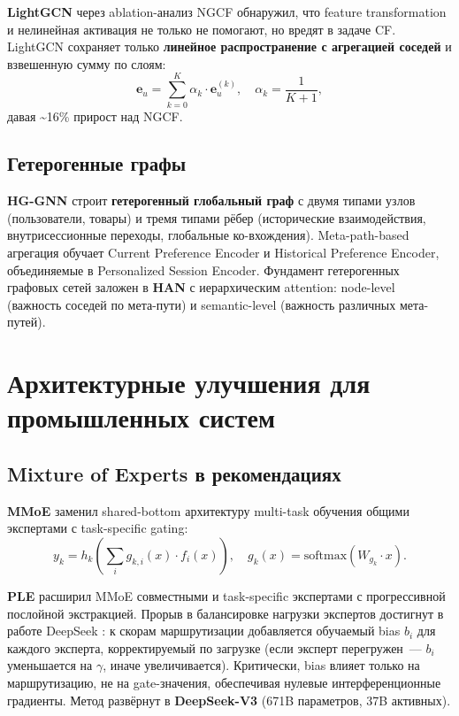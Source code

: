 \textbf{LightGCN} \cite{he2020lightgcn} через ablation-анализ NGCF обнаружил, что feature transformation и нелинейная активация не только не помогают, но вредят в задаче CF. LightGCN сохраняет только \textbf{линейное распространение с агрегацией соседей} и взвешенную сумму по слоям:
\begin{equation}
    \mathbf{e}_u = \sum_{k=0}^{K} \alpha_k \cdot \mathbf{e}_u^{(k)},\quad \alpha_k = \frac{1}{K+1},
\end{equation}
давая \textasciitilde16\% прирост над NGCF.

\subsection{Гетерогенные графы}
\label{subsec:ch1:heterogeneous}

\textbf{HG-GNN} \cite{pang2022hggnn} строит \textbf{гетерогенный глобальный граф} с двумя типами узлов (пользователи, товары) и тремя типами рёбер (исторические взаимодействия, внутрисессионные переходы, глобальные ко-вхождения). Meta-path-based агрегация обучает Current Preference Encoder и Historical Preference Encoder, объединяемые в Personalized Session Encoder. Фундамент гетерогенных графовых сетей заложен в \textbf{HAN} \cite{wang2019han} с иерархическим attention: node-level (важность соседей по мета-пути) и semantic-level (важность различных мета-путей).

\section{Архитектурные улучшения для промышленных систем}
\label{sec:ch1:industrial}

\subsection{Mixture of Experts в рекомендациях}
\label{subsec:ch1:moe}

\textbf{MMoE} \cite{ma2018mmoe} заменил shared-bottom архитектуру multi-task обучения общими экспертами с task-specific gating:
\begin{equation}
    y_k = h_k\!\left(\sum_i g_{k,i}(x) \cdot f_i(x)\right),\quad g_k(x) = \text{softmax}(W_{g_k} \cdot x).
\end{equation}

\textbf{PLE} \cite{tang2020ple} расширил MMoE совместными и task-specific экспертами с прогрессивной послойной экстракцией. Прорыв в балансировке нагрузки экспертов достигнут в работе DeepSeek \cite{wang2024deepseek}: к скорам маршрутизации добавляется обучаемый bias $b_i$ для каждого эксперта, корректируемый по загрузке (если эксперт перегружен~--- $b_i$ уменьшается на $\gamma$, иначе увеличивается). Критически, bias влияет только на маршрутизацию, не на gate-значения, обеспечивая нулевые интерференционные градиенты. Метод развёрнут в \textbf{DeepSeek-V3} (671B параметров, 37B активных).

